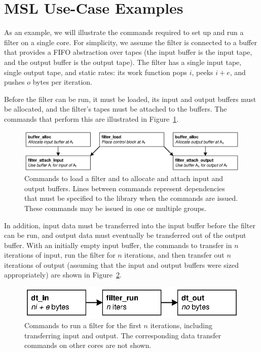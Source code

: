 \section{MSL Use-Case Examples}

As an example, we will illustrate the commands required to set up and
run a filter on a single core. For simplicity, we assume the filter is
connected to a buffer that provides a FIFO abstraction over tapes (the
input buffer is the input tape, and the output buffer is the output
tape). The filter has a single input tape, single output tape, and
static rates: its work function pops $i$, peeks $i+e$, and pushes $o$
bytes per iteration.

Before the filter can be run, it must be loaded, its input and output
buffers must be allocated, and the filter's tapes must be attached to the
buffers. The commands that perform this are illustrated in
Figure~\ref{fig:lib:init}.

\begin{figure}[!htb]
\begin{center}
\includegraphics[scale=.55]{figs/init}
\end{center}
\caption[Commands to set up a filter.]{Commands to load a filter and to allocate and attach input and output buffers. Lines between commands represent dependencies that must be specified to the library when the commands are issued. These commands may be issued in one or multiple groups.}
\label{fig:lib:init}
\end{figure}

In addition, input data must be transferred into the input buffer before the filter can be run, and output data must eventually be transferred out of the output buffer. With an initially empty input buffer, the commands to transfer in $n$ iterations of input, run the filter for $n$ iterations, and then transfer out $n$ iterations of output (assuming that the input and output buffers were sized appropriately) are shown in Figure~\ref{fig:lib:run}.

\begin{figure}[!htb]
\begin{center}
\includegraphics{figs/run}
\end{center}
\caption[Commands to run a filter.]{Commands to run a filter for the
  first $n$ iterations, including transferring input and output. The
  corresponding data transfer commands on other cores are not shown.}
\label{fig:lib:run}
\end{figure}

